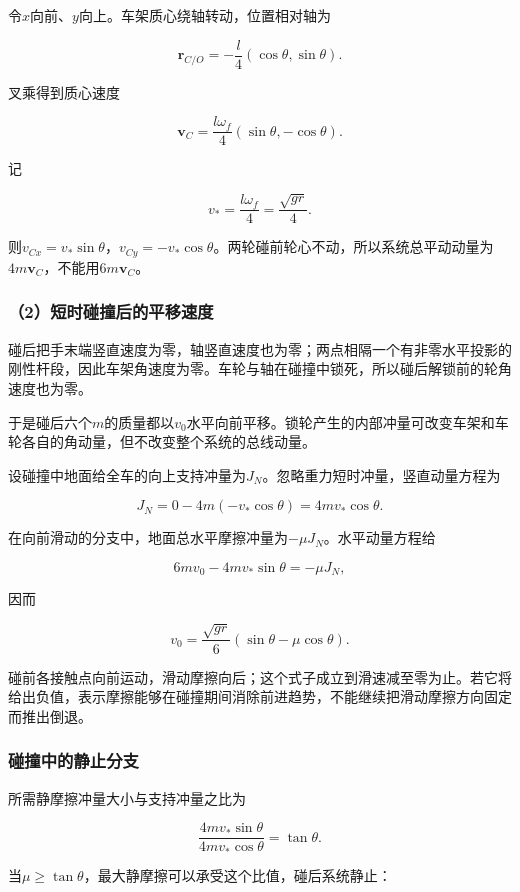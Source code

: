\documentclass[12pt,a4paper,fontset=fandol]{ctexart}
\begin{document}
令\(x\)向前、\(y\)向上。车架质心绕轴转动，位置相对轴为

\[
\boldsymbol r_{C/O}
=-\frac l4(\cos\theta,\sin\theta).
\]

叉乘得到质心速度

\[
\boldsymbol v_C
=\frac{l\omega_f}{4}(\sin\theta,-\cos\theta).
\]

记

\[
v_*=\frac{l\omega_f}{4}=\frac{\sqrt{gr}}4.
\]

则\(v_{Cx}=v_*\sin\theta\)，\(v_{Cy}=-v_*\cos\theta\)。两轮碰前轮心不动，所以系统总平动动量为\(4m\boldsymbol v_C\)，不能用\(6m\boldsymbol v_C\)。

\subsubsection{（2）短时碰撞后的平移速度}\label{ux77edux65f6ux78b0ux649eux540eux7684ux5e73ux79fbux901fux5ea6}

碰后把手末端竖直速度为零，轴竖直速度也为零；两点相隔一个有非零水平投影的刚性杆段，因此车架角速度为零。车轮与轴在碰撞中锁死，所以碰后解锁前的轮角速度也为零。

于是碰后六个\(m\)的质量都以\(v_0\)水平向前平移。锁轮产生的内部冲量可改变车架和车轮各自的角动量，但不改变整个系统的总线动量。

设碰撞中地面给全车的向上支持冲量为\(J_N\)。忽略重力短时冲量，竖直动量方程为

\[
J_N=0-4m(-v_*\cos\theta)
=4mv_*\cos\theta.
\]

在向前滑动的分支中，地面总水平摩擦冲量为\(-\mu J_N\)。水平动量方程给

\[
6mv_0-4mv_*\sin\theta=-\mu J_N,
\]

因而

\[
\boxed{
v_0=\frac{\sqrt{gr}}6
(\sin\theta-\mu\cos\theta)}.
\]

碰前各接触点向前运动，滑动摩擦向后；这个式子成立到滑速减至零为止。若它将给出负值，表示摩擦能够在碰撞期间消除前进趋势，不能继续把滑动摩擦方向固定而推出倒退。

\subsubsection{碰撞中的静止分支}\label{ux78b0ux649eux4e2dux7684ux9759ux6b62ux5206ux652f}

所需静摩擦冲量大小与支持冲量之比为

\[
\frac{4mv_*\sin\theta}{4mv_*\cos\theta}
=\tan\theta.
\]

当\(\mu\ge\tan\theta\)，最大静摩擦可以承受这个比值，碰后系统静止：
\end{document}
